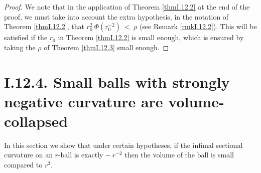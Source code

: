 \documentclass[12pt]{amsart}
\numberwithin{equation}{section}
\theoremstyle{plain}
\theoremstyle{definition}
\theoremstyle{remark}
\begin{document}
\begin{proof}
We note that in the application of Theorem \ref{thmI.12.2}
at the end of the proof, we must take into account the
extra hypothesis, in the notation of
Theorem \ref{thmI.12.2}, that
$r_0^2 \: \Phi(r_0^{-2}) \: < \: \rho$
(see Remark \ref{rmkI.12.2}).  This
will be satisfied if the $r_0$ in Theorem \ref{thmI.12.2} is small
enough, which is ensured
by taking the $\rho$ of Theorem \ref{thmI.12.3} small enough.
\end{proof}

\section{I.12.4. Small balls with strongly negative curvature are
volume-collapsed}
\label{I.12.4}

In this section we show that under certain hypotheses, if the infimal sectional 
curvature on an $r$-ball is exactly $- \: r^{-2}$ then the volume of the ball
is small compared to $r^3$.
\end{document}
